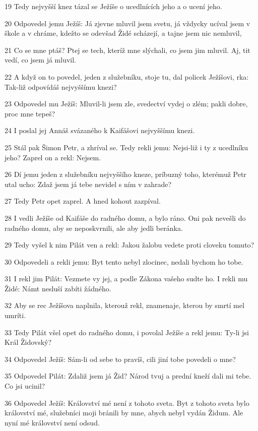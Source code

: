 \par 19 Tedy nejvyšší knez tázal se Ježíše o ucedlnících jeho a o ucení jeho.
\par 20 Odpovedel jemu Ježíš: Já zjevne mluvil jsem svetu, já vždycky ucíval jsem v škole a v chráme, kdežto se odevšad Židé scházejí, a tajne jsem nic nemluvil,
\par 21 Co se mne ptáš? Ptej se tech, kteríž mne slýchali, co jsem jim mluvil. Aj, tit vedí, co jsem já mluvil.
\par 22 A když on to povedel, jeden z služebníku, stoje tu, dal policek Ježíšovi, rka: Tak-liž odpovídáš nejvyššímu knezi?
\par 23 Odpovedel mu Ježíš: Mluvil-li jsem zle, svedectví vydej o zlém; pakli dobre, proc mne tepeš?
\par 24 I poslal jej Annáš svázaného k Kaifášovi nejvyššímu knezi.
\par 25 Stál pak Šimon Petr, a zhríval se. Tedy rekli jemu: Nejsi-liž i ty z ucedlníku jeho? Zaprel on a rekl: Nejsem.
\par 26 Dí jemu jeden z služebníku nejvyššího kneze, príbuzný toho, kterémuž Petr utal ucho: Zdaž jsem já tebe nevidel s ním v zahrade?
\par 27 Tedy Petr opet zaprel. A hned kohout zazpíval.
\par 28 I vedli Ježíše od Kaifáše do radného domu, a bylo ráno. Oni pak nevešli do radného domu, aby se neposkvrnili, ale aby jedli beránka.
\par 29 Tedy vyšel k nim Pilát ven a rekl: Jakou žalobu vedete proti cloveku tomuto?
\par 30 Odpovedeli a rekli jemu: Byt tento nebyl zlocinec, nedali bychom ho tobe.
\par 31 I rekl jim Pilát: Vezmete vy jej, a podle Zákona vašeho sudte ho. I rekli mu Židé: Námt nesluší zabíti žádného.
\par 32 Aby se rec Ježíšova naplnila, kterouž rekl, znamenaje, kterou by smrtí mel umríti.
\par 33 Tedy Pilát všel opet do radného domu, i povolal Ježíše a rekl jemu: Ty-li jsi Král Židovský?
\par 34 Odpovedel Ježíš: Sám-li od sebe to pravíš, cili jiní tobe povedeli o mne?
\par 35 Odpovedel Pilát: Zdaliž jsem já Žid? Národ tvuj a prední kneží dali mi tebe. Co jsi ucinil?
\par 36 Odpovedel Ježíš: Království mé není z tohoto sveta. Byt z tohoto sveta bylo království mé, služebníci moji bránili by mne, abych nebyl vydán Židum. Ale nyní mé království není odsud.
